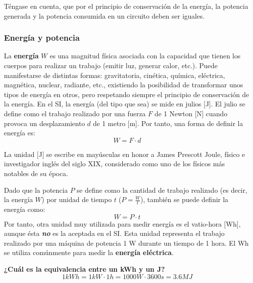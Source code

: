 	\begin{remark}
	    Téngase en cuenta, que por el principio de conservación de la energía, la potencia generada y la potencia consumida en un circuito deben ser iguales.
	\end{remark}
	
	\subsubsection{Energía y potencia}
	
	La \textbf{energía} $W$ es una magnitud física asociada con la capacidad que tienen los cuerpos para realizar un trabajo (emitir luz, generar calor, etc.). Puede manifestarse de distintas formas: gravitatoria, cinética, química, eléctrica, magnética, nuclear, radiante, etc., existiendo la posibilidad de transformar unos tipos de energía en otros, pero respetando siempre el principio de conservación de la energía. En el SI, la energía (del tipo que sea) se mide en julios [J]. El julio se define como el trabajo realizado por una fuerza $F$ de 1 Newton [N] cuando provoca un desplazamiento $d$ de 1 metro [m]. Por tanto, una forma de definir la energía es:
	\begin{equation*}
		W=F\cdot d 
	\end{equation*}
	\begin{remark}
		La unidad [J] se escribe en mayúsculas en honor a James Prescott Joule, físico e investigador inglés del siglo XIX, considerado como uno de los físicos más notables de su época. 
	\end{remark}
	
	Dado que la potencia $P$ se define como la cantidad de trabajo realizado (es decir, la energía $W$) por unidad de tiempo $t$ ($P=\frac{W}{t}$), también se puede definir la energía como:
	\begin{equation*}\label{eq.Ept}
		W=P\cdot t
	\end{equation*}
	Por tanto, otra unidad muy utilizada para medir energía es el vatio-hora [Wh], aunque ésta \textbf{\emph{no}} es la aceptada en el SI. Esta unidad representa el trabajo realizado por una máquina de potencia 1 W durante un tiempo de 1 hora. El Wh se utiliza comúnmente para medir la \textbf{energía eléctrica}. 
	
	\vspace{4mm}
	\begin{example}
		\textbf{¿Cuál es la equivalencia entre un kWh y un J?}
		\begin{equation*}
		    1 kWh = 1 kW \cdot 1 h = 1000 W \cdot 3600 s = 3.6 MJ 
		\end{equation*}
	\end{example}
	

